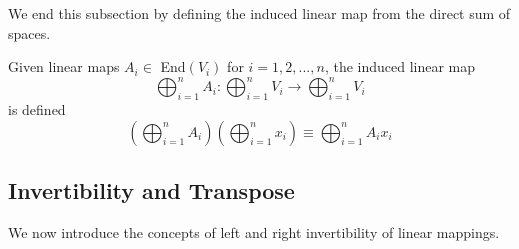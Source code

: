   We end this subsection by defining the induced linear map from the direct sum of spaces. 

  \begin{definition}
    Given linear maps $A_i \in$ End$(V_i)$ for $i = 1, 2, ..., n$, the induced linear map
    \begin{equation}
      \bigoplus_{i =1}^n A_i: \bigoplus_{i=1}^n V_i \longrightarrow \bigoplus_{i=1}^n V_i
    \end{equation}
    is defined
    \begin{equation}
      (\bigoplus_{i=1}^n A_i)(\bigoplus_{i=1}^n x_i) \equiv \bigoplus_{i=1}^n A_i x_i
    \end{equation}
  \end{definition}

\subsection{Invertibility and Transpose}

  We now introduce the concepts of left and right invertibility of linear mappings. 

